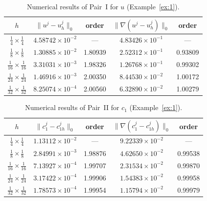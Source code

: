 \documentclass[a4paper,fleqn]{cas-sc}
\numberwithin{equation}{section}
\theoremstyle{definition}
\begin{document}
\begin{table}[htbp]
\centering
\caption{Numerical results of Pair~I for $u$ (Example~\ref{ex:1}).}
\label{tab:PairI-u}
\begin{tabular}{ccccc}
\hline
$h$ &
$\|u^{j} - u_{h}^{j}\|_{0}$ & order &
$\|\nabla(u^{j} - u_{h}^{j})\|_{0}$ & order \\
\hline
$\tfrac{1}{4} \times \tfrac{1}{4}$   & $4.58742\times10^{-2}$ & ---     & $4.83426\times10^{-1}$ & ---     \\
$\tfrac{1}{8} \times \tfrac{1}{8}$   & $1.30885\times10^{-2}$ & 1.80939 & $2.52312\times10^{-1}$ & 0.93809 \\
$\tfrac{1}{16}\times \tfrac{1}{16}$  & $3.31031\times10^{-3}$ & 1.98326 & $1.26768\times10^{-1}$ & 0.99302 \\
$\tfrac{1}{24}\times \tfrac{1}{24}$  & $1.46916\times10^{-3}$ & 2.00350 & $8.44530\times10^{-2}$ & 1.00172 \\
$\tfrac{1}{32}\times \tfrac{1}{32}$  & $8.25074\times10^{-4}$ & 2.00560 & $6.32890\times10^{-2}$ & 1.00279 \\
\hline
\end{tabular}
\end{table}


\begin{table}[htbp]
\centering
\caption{Numerical results of Pair~II for $c_{1}$ (Example~\ref{ex:1}).}
\label{tab:PairII-c1}
\begin{tabular}{ccccc}
\hline
$h$ &
$\|c_{1}^{j} - c_{1h}^{j}\|_{0}$ & order &
$\|\nabla(c_{1}^{j} - c_{1h}^{j})\|_{0}$ & order \\
\hline
$\tfrac{1}{4} \times \tfrac{1}{4}$   & $1.13112\times10^{-2}$ & ---     & $9.22339\times10^{-2}$ & ---     \\
$\tfrac{1}{8} \times \tfrac{1}{8}$   & $2.84991\times10^{-3}$ & 1.98876 & $4.62650\times10^{-2}$ & 0.99538 \\
$\tfrac{1}{16}\times \tfrac{1}{16}$  & $7.13927\times10^{-4}$ & 1.99707 & $2.31534\times10^{-2}$ & 0.99870 \\
$\tfrac{1}{24}\times \tfrac{1}{24}$  & $3.17422\times10^{-4}$ & 1.99906 & $1.54383\times10^{-2}$ & 0.99958 \\
$\tfrac{1}{32}\times \tfrac{1}{32}$  & $1.78573\times10^{-4}$ & 1.99954 & $1.15794\times10^{-2}$ & 0.99979 \\
\hline
\end{tabular}
\end{table}
\end{document}
